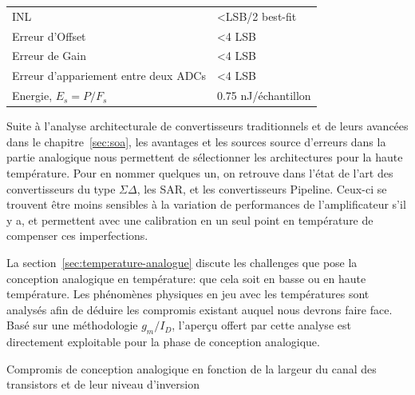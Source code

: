 \begin{mdframed}[linecolor=Prune,linewidth=1]
\begin{center}
\begin{tabular}{ll}
    INL                              & \textless LSB/2 best-fit                                                                                                                             \\
    Erreur d'Offset                     & \textless 4 LSB                                                                                                                                             \\
    Erreur de Gain                       & \textless 4 LSB                                                                                                                                             \\
    Erreur d'appariement entre deux ADCs      & \textless 4 LSB                                                                                                                                             \\
    Energie, $E_s = P/F_s$            & 0.75 nJ/échantillon      \\ \bottomrule                                                                                                                                       
    \end{tabular}
\end{center}

Suite à l’analyse architecturale de convertisseurs traditionnels et de leurs avancées dans le chapitre~\ref{sec:soa}, les avantages et les sources source d’erreurs dans la partie analogique nous permettent de sélectionner les architectures pour la haute température. Pour en nommer quelques un, on retrouve dans l’état de l’art des convertisseurs du type \(\Sigma \Delta\), les SAR, et les convertisseurs Pipeline. Ceux-ci se trouvent être moins sensibles à la variation de performances de l’amplificateur s'il y a, et permettent avec une calibration en un seul point en température de compenser ces imperfections.

La section~\ref{sec:temperature-analogue} discute les challenges que pose la conception analogique en température: que cela soit en basse ou en haute température. Les phénomènes physiques en jeu avec les températures sont analysés afin de déduire les compromis existant auquel nous devrons faire face.  Basé sur une méthodologie \(g_m/I_D\), l’aperçu offert par cette analyse est directement exploitable pour la phase de conception analogique.

\begin{center}
    \centering
    
    \caption[]{Compromis de conception analogique en fonction de la largeur du canal des transistors et de leur niveau d'inversion}
    \label{fig:tradeoffs-fr}
\end{center}


\end{mdframed}
